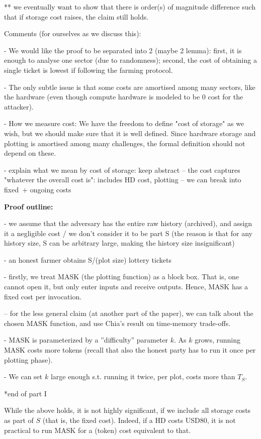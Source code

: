 \documentclass[12pt,draftcls,onecolumn]{IEEEtran}
\begin{document}
** we eventually want to show that there is order(s) of magnitude difference such that if storage cost raises, the claim still holds.


Comments (for ourselves as we discuss this):

- We would like the proof to be separated into 2 (maybe 2 lemma): first, it is enough to analyse one sector (due to randomness); second, the cost of obtaining a single ticket is lowest if following the farming protocol.

- The only subtle issue is that some costs are amortised among many sectors, like the hardware (even though compute hardware is modeled to be 0 cost for the attacker).

- How we measure cost: We have the freedom to define "cost of storage" as we wish, but we should make sure that it is well defined. Since hardware storage and plotting is amortised among many challenges, the formal definition should not depend on these.

- explain what we mean by cost of storage: keep abstract -- the cost captures "whatever the overall cost is": includes HD cost, plotting -- we can break into fixed + ongoing costs


{\bf Proof outline:}

- we assume that the adversary has the entire raw history (archived), and assign it a negligible cost / we don't consider it to be part S (the reason is that for any history size, S can be arbitrary large, making the history size insignificant)

- an honest farmer obtains S/(plot size) lottery tickets 

- firstly, we treat MASK (the plotting function) as a block box. That is, one cannot open it, but only enter inputs and receive outputs. Hence, MASK has a fixed cost per invocation.

-- for the less general claim (at another part of the paper), we can talk about the chosen MASK function, and use Chia's result on time-memory trade-offs.

- MASK is parameterized by a ''difficulty'' parameter $k$. As $k$ grows, running MASK costs more tokens (recall that also the honest party has to run it once per plotting phase).

- We can set $k$ large enough s.t. running it twice, per plot, costs more than $T_S$.

*end of part I

While the above holds, it is not highly significant, if we include all storage costs as part of $S$ (that is, the fixed cost). Indeed, if a HD costs USD80, it is not practical to run MASK for a (token) cost equivalent to that. 
\end{document}
